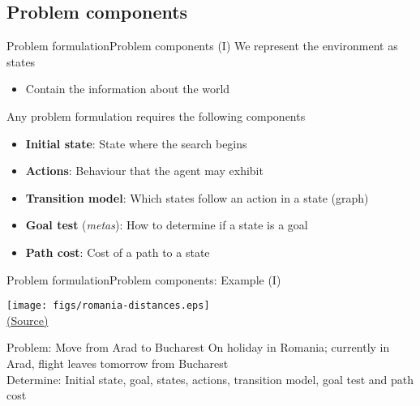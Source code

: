 \documentclass[10pt,compress]{beamer} %
\begin{document}
\subsection{Problem components}
\begin{frame}{Problem formulation}{Problem components (I)}
    We represent the environment as \alert{states}
        \begin{itemize}
            \item Contain the information about the world
        \end{itemize}
    Any problem formulation requires the following components
	\begin{itemize}
        \item \textbf{Initial state}: State where the search begins
        \item \textbf{Actions}: Behaviour that the agent may exhibit
        \item \textbf{Transition model}: Which states follow an action in a state (\alert{graph})
        \item \textbf{Goal test} (\textit{metas}): How to determine if a state is a goal
        \item \textbf{Path cost}: Cost of a path to a state
	\end{itemize}
\end{frame}

\begin{frame}{Problem formulation}{Problem components: Example (I)}
    \begin{center}
	    \texttt{[image: figs/romania-distances.eps]}\\
	    \tiny{\href{http://aima.cs.berkeley.edu/index.html}{(Source)}}
	\end{center}

    \begin{exampleblock}{Problem: Move from Arad to Bucharest}
        On holiday in Romania; currently in Arad, flight leaves tomorrow from Bucharest\\
        Determine: Initial state, goal, states, actions, transition model, goal test and path cost
    \end{exampleblock}
\end{frame}
\end{document}
